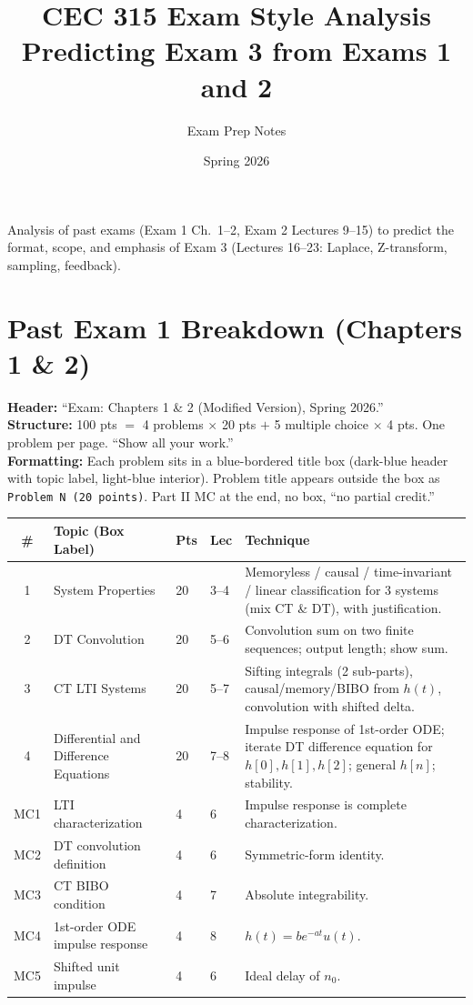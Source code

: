 \documentclass[11pt]{article}
\title{CEC 315 Exam Style Analysis \\ \large Predicting Exam 3 from Exams 1 and 2}
\author{Exam Prep Notes}
\date{Spring 2026}
\begin{document}
\maketitle

\noindent Analysis of past exams (Exam 1 Ch.\ 1--2, Exam 2 Lectures 9--15) to predict the format, scope, and emphasis of Exam 3 (Lectures 16--23: Laplace, Z-transform, sampling, feedback).

\section{Past Exam 1 Breakdown (Chapters 1 \& 2)}

\textbf{Header:} ``Exam: Chapters 1 \& 2 (Modified Version), Spring 2026.''\\
\textbf{Structure:} 100 pts $=$ 4 problems $\times$ 20 pts $+$ 5 multiple choice $\times$ 4 pts. One problem per page. ``Show all your work.''\\
\textbf{Formatting:} Each problem sits in a blue-bordered title box (dark-blue header with topic label, light-blue interior). Problem title appears outside the box as \texttt{Problem N (20 points)}. Part II MC at the end, no box, ``no partial credit.''

\begin{longtable}{@{}clp{1.6cm}p{1.4cm}p{5.8cm}@{}}
\toprule
\# & Topic (Box Label) & Pts & Lec & Technique \\
\midrule
\endhead
1 & System Properties & 20 & 3--4 & Memoryless / causal / time-invariant / linear classification for 3 systems (mix CT \& DT), with justification. \\
2 & DT Convolution & 20 & 5--6 & Convolution sum on two finite sequences; output length; show sum. \\
3 & CT LTI Systems & 20 & 5--7 & Sifting integrals (2 sub-parts), causal/memory/BIBO from $h(t)$, convolution with shifted delta. \\
4 & Differential and Difference Equations & 20 & 7--8 & Impulse response of 1st-order ODE; iterate DT difference equation for $h[0],h[1],h[2]$; general $h[n]$; stability. \\
MC1 & LTI characterization & 4 & 6 & Impulse response is complete characterization. \\
MC2 & DT convolution definition & 4 & 6 & Symmetric-form identity. \\
MC3 & CT BIBO condition & 4 & 7 & Absolute integrability. \\
MC4 & 1st-order ODE impulse response & 4 & 8 & $h(t)=b e^{-at}u(t)$. \\
MC5 & Shifted unit impulse & 4 & 6 & Ideal delay of $n_0$. \\
\bottomrule
\end{longtable}
\end{document}
